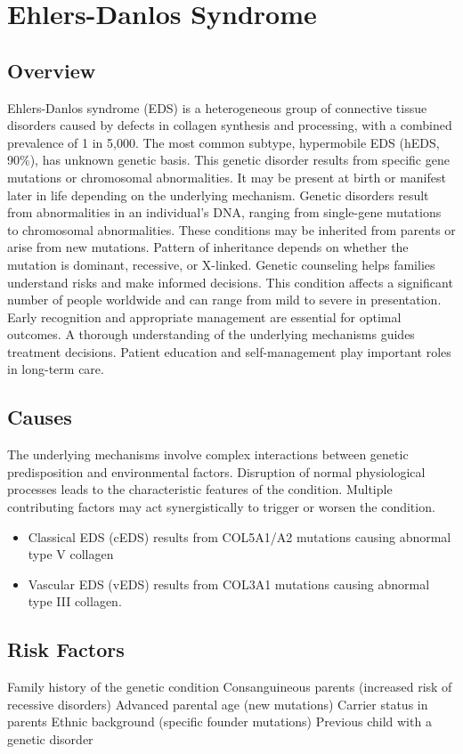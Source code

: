 \chapter{Ehlers-Danlos Syndrome}
\label{sec:Ehlers-Danlos Syndrome}

\section{Overview}
Ehlers-Danlos syndrome (EDS) is a heterogeneous group of connective tissue disorders caused by defects in collagen synthesis and processing, with a combined prevalence of 1 in 5,000. The most common subtype, hypermobile EDS (hEDS, 90\%), has unknown genetic basis. This genetic disorder results from specific gene mutations or chromosomal abnormalities. It may be present at birth or manifest later in life depending on the underlying mechanism. Genetic disorders result from abnormalities in an individual's DNA, ranging from single-gene mutations to chromosomal abnormalities. These conditions may be inherited from parents or arise from new mutations. Pattern of inheritance depends on whether the mutation is dominant, recessive, or X-linked. Genetic counseling helps families understand risks and make informed decisions. This condition affects a significant number of people worldwide and can range from mild to severe in presentation. Early recognition and appropriate management are essential for optimal outcomes. A thorough understanding of the underlying mechanisms guides treatment decisions. Patient education and self-management play important roles in long-term care.
\section{Causes}
The underlying mechanisms involve complex interactions between genetic predisposition and environmental factors. Disruption of normal physiological processes leads to the characteristic features of the condition. Multiple contributing factors may act synergistically to trigger or worsen the condition.

\begin{itemize}[noitemsep]
  \item Classical EDS (cEDS) results from COL5A1/A2 mutations causing abnormal type V collagen
  \item Vascular EDS (vEDS) results from COL3A1 mutations causing abnormal type III collagen.
\end{itemize}
\section{Risk Factors}
Family history of the genetic condition Consanguineous parents (increased risk of recessive disorders) Advanced parental age (new mutations) Carrier status in parents Ethnic background (specific founder mutations) Previous child with a genetic disorder

